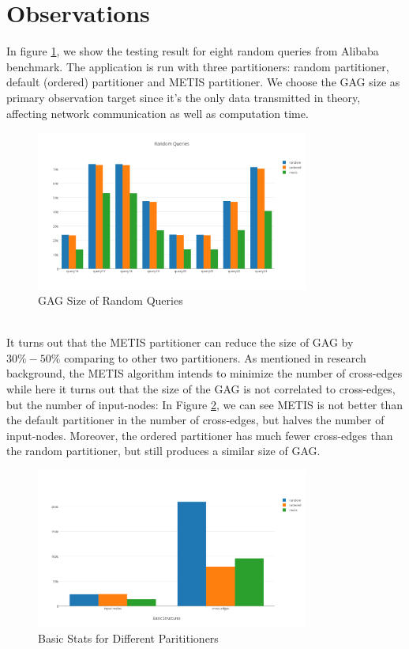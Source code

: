 \section{Observations}
In figure \ref{fig:alibaba-Random-Queries}, we show the testing result for eight random queries from Alibaba benchmark. The application is run with three partitioners: random partitioner, default (ordered) partitioner and METIS partitioner. We choose the GAG size as primary observation target since it's the only data transmitted in theory, affecting network communication as well as computation time.  
\begin{figure}[h!]
  \caption{GAG Size of Random Queries}
  \label{fig:alibaba-Random-Queries}
  \centering
    \includegraphics[width=0.8\textwidth]{img/alibaba-Random-Queries}
\end{figure}
\\It turns out that the METIS partitioner can reduce the size of GAG by $30\%-50\%$ comparing to other two partitioners. As mentioned in research background, the METIS algorithm intends to minimize the number of cross-edges while here it turns out that the size of the GAG is not correlated to cross-edges, but the number of input-nodes: In Figure \ref{fig:alibaba-structure}, we can see METIS is not better than the default partitioner in the number of cross-edges, but halves the number of input-nodes. Moreover, the ordered partitioner has much fewer cross-edges than the random partitioner, but still produces a similar size of GAG.
\begin{figure}[h!]
  \caption{Basic Stats for Different Parititioners}
  \label{fig:alibaba-structure}
  \centering
    \includegraphics[width=0.8\textwidth]{img/alibaba-structure}
\end{figure}
